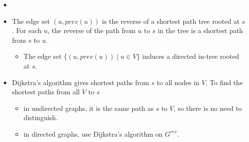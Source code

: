 \begin{itemize}
    \item[] 
    \item The edge set $(u, prev(u))$ is the reverse of a shortest path tree rooted at $s$. For each $u$, the reverse of the path from $u$ to $s$ in the tree is a shortest path from $s$ to $u$.
    \begin{itemize}
        \item The edge set $\{ (u, prev(u)) \mid u \in V \}$ induces a directed in-tree rooted at $s$.
    \end{itemize}
    \item Dijkstra's algorithm gives shortest paths from $s$ to all nodes in $V$. To find the shortest paths from all $V$ to $s$
    \begin{itemize}
        \item in undirected graphs, it is the same path as $s$ to $V$, so there is no need to distinguish.
        \item in directed graphs, use Dijkstra's algorithm on $G^{rev}$.
    \end{itemize}
\end{itemize}

